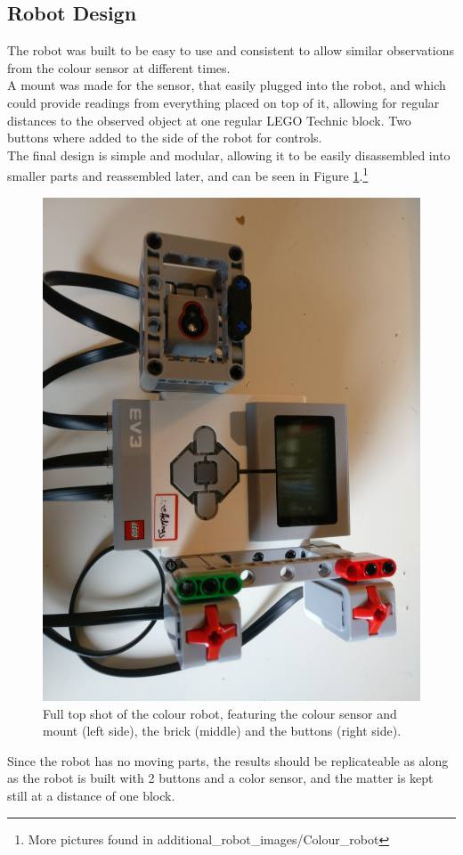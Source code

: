 \documentclass[11pt, a4paper]{article}
\begin{document}
\subsection{Robot Design}
The robot was built to be easy to use and consistent to allow similar observations from the colour sensor at different times. \\
A mount was made for the sensor, that easily plugged into the robot, and which could provide readings from everything placed on top of it, allowing for regular distances to the observed object at one regular LEGO Technic block. Two buttons where added to the side of the robot for controls. \\
The final design is simple and modular, allowing it to be easily disassembled into smaller parts and reassembled later, and can be seen in Figure \ref{fig:colour_robot_full_shot}.\footnote{More pictures found in additional\_robot\_images/Colour\_robot} \\
\begin{figure}[H]
	\centering
	\includegraphics[scale=0.05,angle=90]{images/colour_robot_full.jpg} 	
	\caption{Full top shot of the colour robot, featuring the colour sensor and mount (left side), the brick (middle) and the buttons (right side).}
	\label{fig:colour_robot_full_shot}
\end{figure}
Since the robot has no moving parts, the results should be replicateable as along as the robot is built with 2 buttons and a color sensor, and the matter is kept still at a distance of one block.
\end{document}
